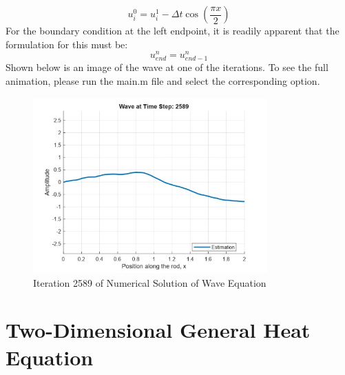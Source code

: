 \documentclass{article}
\begin{document}
\begin{equation}
    u_i^0 = u_i^1 - \Delta t\cos\left(\frac{\pi x}{2}\right)
\end{equation}
For the boundary condition at the left endpoint, it is readily apparent that the formulation for this must be:
\begin{equation}
    u_{end}^n = u_{end-1}^n
\end{equation}
Shown below is an image of the wave at one of the iterations. To see the full animation, please run the main.m file and select the corresponding option.
\begin{figure}[H]
    \centering
    \includegraphics[width=0.8\textwidth]{wave_example.jpg}
    \caption{Iteration 2589 of Numerical Solution of Wave Equation}
\end{figure}

\section{Two-Dimensional General Heat Equation}
\end{document}
